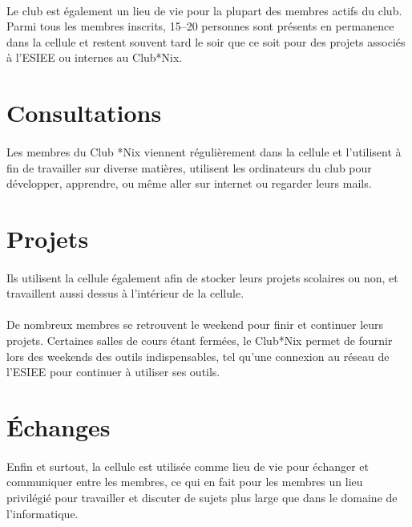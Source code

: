 \documentclass[11pt]{report}
\begin{document}
\paragraph{} Le club est également un lieu de vie pour la plupart des membres
actifs du club. Parmi tous les membres inscrits, 15--20 personnes sont présents
en permanence dans la cellule et restent souvent tard le soir que ce soit pour
des projets associés à l'ESIEE ou internes au Club*Nix.

\section{Consultations}

\paragraph{} Les membres du Club *Nix viennent régulièrement dans la cellule et
l'utilisent à fin de travailler sur diverse matières, utilisent les ordinateurs
du club pour développer, apprendre, ou même aller sur internet ou regarder
leurs mails.

\section{Projets}

\paragraph{} Ils utilisent la cellule également afin de stocker leurs projets
scolaires ou non, et travaillent aussi dessus à l'intérieur de la cellule.

\paragraph{} De nombreux membres se retrouvent le weekend pour finir et
continuer leurs projets. Certaines salles de cours étant fermées, le Club*Nix
permet de fournir lors des weekends des outils indispensables, tel qu'une
connexion au réseau de l'ESIEE pour continuer à utiliser ses outils.

\section{Échanges}

\paragraph{} Enfin et surtout, la cellule est utilisée comme lieu de vie pour
échanger et communiquer entre les membres, ce qui en fait pour les membres un
lieu privilégié pour travailler et discuter de sujets plus large que dans le
domaine de l'informatique.
\end{document}
